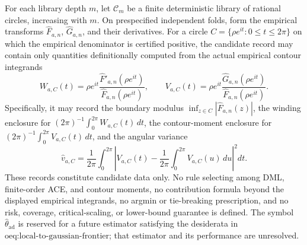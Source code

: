 For each library depth \(m\), let \(\mathscr C_m\) be a finite deterministic library of rational circles, increasing with \(m\).  On prespecified independent folds, form the empirical transforms \(\widehat F_{a,n}\), \(\widehat G_{a,n}\), and their derivatives.  For a circle \(C=\{\rho e^{it}:0\le t\le2\pi\}\) on which the empirical denominator is certified positive, the candidate record may contain only quantities definitionally computed from the actual empirical contour integrands
\[
 W_{a,C}(t)=\rho e^{it}
 \frac{\widehat F'_{a,n}(\rho e^{it})}
      {\widehat F_{a,n}(\rho e^{it})},
 \qquad
 V_{a,C}(t)=\rho e^{it}
 \frac{\widehat G_{a,n}(\rho e^{it})}
      {\widehat F_{a,n}(\rho e^{it})}.
\]
Specifically, it may record the boundary modulus \(\inf_{z\in C}|\widehat F_{a,n}(z)|\), the winding enclosure for \((2\pi)^{-1}\int_0^{2\pi}W_{a,C}(t)\,dt\), the contour-moment enclosure for \((2\pi)^{-1}\int_0^{2\pi}V_{a,C}(t)\,dt\), and the angular variance
\[
 \widehat v_{a,C}
 =\frac1{2\pi}\int_0^{2\pi}
 \left|V_{a,C}(t)-
 \frac1{2\pi}\int_0^{2\pi}V_{a,C}(u)\,du\right|^2dt.
\]
These records constitute candidate data only.  No rule selecting among DML, finite-order ACE, and contour moments, no contribution formula beyond the displayed empirical integrands, no argmin or tie-breaking prescription, and no risk, coverage, critical-scaling, or lower-bound guarantee is defined.  The symbol \(\widehat\theta_{\mathrm{ad}}\) is reserved for a future estimator satisfying the desiderata in \(\text{oeq:local-to-gaussian-frontier}\); that estimator and its performance are unresolved.